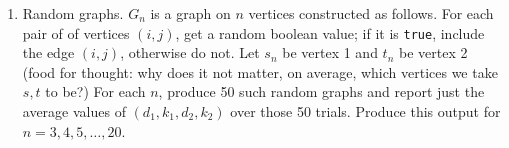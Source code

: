 \documentclass[12pt]{article}
\begin{document}
\begin{enumerate}
\begin{enumerate}
\begin{enumerate}
	\item Random graphs. $G_n$ is a graph on $n$ vertices constructed as follows. For each pair of of vertices $(i,j)$, get a random boolean value; if it is \texttt{true}, include the edge $(i,j)$, otherwise do not. Let $s_n$ be vertex 1 and $t_n$ be vertex 2 (food for thought: why does it not matter, on average, which vertices we take $s,t$ to be?) For each $n$, produce 50 such random graphs and report just the average values of $(d_1,k_1,d_2,k_2)$ over those 50 trials. Produce this output for $n=3,4,5,\dotsc,20$.
	\end{enumerate}
	\end{enumerate}
	
\end{enumerate}
\end{document}

